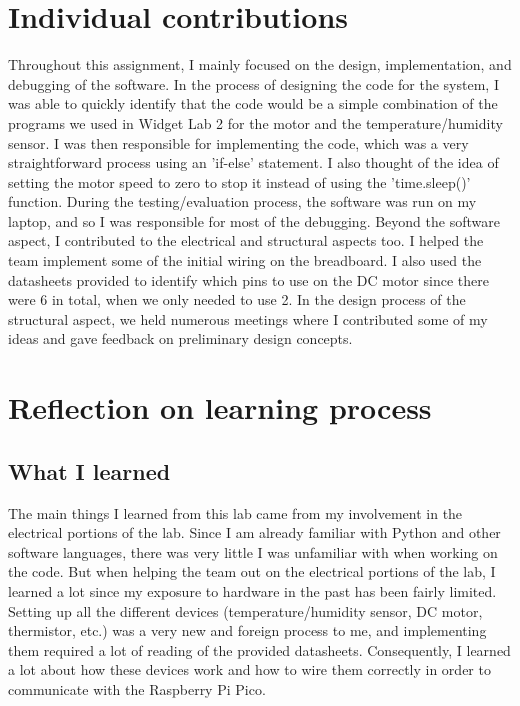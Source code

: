 \documentclass[11pt]{article}
\begin{document}
\section{Individual contributions}
Throughout this assignment, I mainly focused on the design, implementation, and debugging of the software. 
In the process of designing the code for the system, I was able to quickly identify that the code would be a simple combination of the programs we used in Widget Lab 2 for the motor and the temperature/humidity sensor. 
I was then responsible for implementing the code, which was a very straightforward process using an 'if-else' statement.  
I also thought of the idea of setting the motor speed to zero to stop it instead of using the 'time.sleep()' function.
During the testing/evaluation process, the software was run on my laptop, and so I was responsible for most of the debugging.
Beyond the software aspect, I contributed to the electrical and structural aspects too. 
I helped the team implement some of the initial wiring on the breadboard. I also used the datasheets provided to identify which pins to use on the DC motor since there were 6 in total, when we only needed to use 2.
In the design process of the structural aspect, we held numerous meetings where I contributed some of my ideas and gave feedback on preliminary design concepts.



\section{Reflection on learning process}

\subsection{What I learned}
The main things I learned from this lab came from my involvement in the electrical portions of the lab. Since I am already familiar with Python and other software languages, there was very little I was unfamiliar with when working on the code. But when helping the team out on the electrical portions of the lab, I learned a lot since my exposure to hardware in the past has been fairly limited. Setting up all the different devices (temperature/humidity sensor, DC motor,
thermistor, etc.) was a very new and foreign process to me, and implementing them required a lot of reading of the provided datasheets. Consequently, I learned a lot about how these devices work and how to wire them correctly in order to communicate with the Raspberry Pi Pico.
\end{document}
